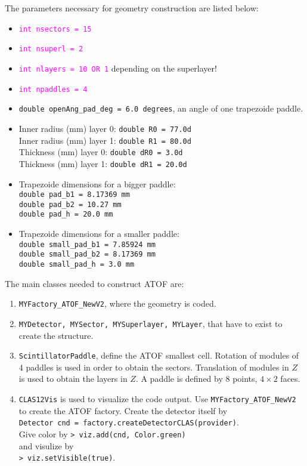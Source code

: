 The parameters necessary for geometry construction are listed below:
\begin{itemize}
		\item {\textcolor{magenta}{\texttt{int nsectors = 15}}}
		\item {\textcolor{magenta}{\texttt{int nsuperl = 2}}}
		\item {\textcolor{magenta}{\texttt{int nlayers = 10 OR 1}}} depending on the superlayer!
		\item {\textcolor{magenta}{\texttt{int npaddles = 4}}}
		\item \texttt{double openAng\_pad\_deg = 6.0 degrees}, an angle of one trapezoide paddle. 
		\item {Inner radius (mm) layer 0: \texttt{double R0 = 77.0d} \\
        Inner radius (mm) layer 1: \texttt{double R1 = 80.0d} \\
        Thickness (mm) layer 0: \texttt{double dR0 = 3.0d} \\
        Thickness (mm) layer 1: \texttt{double dR1 = 20.0d}}
		\item {Trapezoide dimensions for a bigger paddle: \\ 
        		\texttt{double pad\_b1 = 8.17369 mm \\
        				double pad\_b2 = 10.27 mm \\
        				double pad\_h = 20.0 mm}}
        
		\item {Trapezoide dimensions for a smaller paddle: \\
        		\texttt{double small\_pad\_b1 = 7.85924 mm \\
        				double small\_pad\_b2 = 8.17369 mm \\
        				double small\_pad\_h = 3.0 mm}}
	\end{itemize}
	
The main classes needed to construct ATOF are:
\begin{enumerate}
	\item \texttt{MYFactory\_ATOF\_NewV2}, where the geometry is coded.
	\item \texttt{MYDetector, MYSector, MYSuperlayer, MYLayer}, that have to exist to create the structure.
	\item \texttt{ScintillatorPaddle}, define the ATOF smallest cell. Rotation of modules of 4 paddles is used in order to obtain the sectors. Translation of modules in $Z$ is used to obtain the layers in $Z$. A paddle is defined by 8 points, $4 \times 2$ faces.
	\item \texttt{CLAS12Vis} is used to visualize the code output. Use \texttt{MYFactory\_ATOF\_NewV2} to create the ATOF factory. Create the detector itself by \\ \texttt{Detector cnd = factory.createDetectorCLAS(provider)}. \\ Give color by  \texttt{> viz.add(cnd, Color.green)} \\ and visulize by \\ \texttt{> viz.setVisible(true)}.
\end{enumerate}

